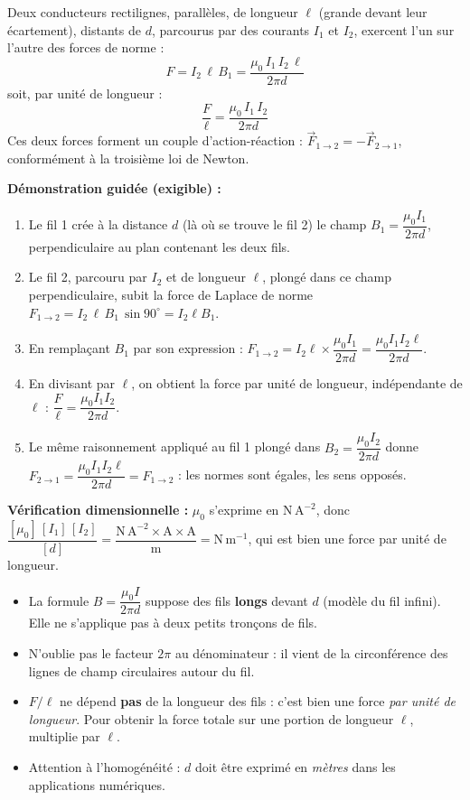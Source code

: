 \documentclass[11pt]{article}
\newcommand{\cle}[1]{{\popxbold\color{popdark}#1}}
\begin{document}
\begin{propriete}
Deux conducteurs rectilignes, parallèles, de longueur $\ell$ (grande devant leur écartement), distants de $d$, parcourus par des courants $I_1$ et $I_2$, exercent l'un sur l'autre des forces de norme :
\[ F = I_2\, \ell\, B_1 = \frac{\mu_0\, I_1\, I_2\, \ell}{2\pi d} \]
soit, par unité de longueur :
\[ \boxed{\ \frac{F}{\ell} = \frac{\mu_0\, I_1\, I_2}{2\pi d}\ } \]
Ces deux forces forment un couple d'\cle{action-réaction} : $\vec{F}_{1\to 2} = -\vec{F}_{2\to 1}$, conformément à la troisième loi de Newton.

\textbf{Démonstration guidée (exigible) :}
\begin{enumerate}
\item Le fil 1 crée à la distance $d$ (là où se trouve le fil 2) le champ $B_1 = \dfrac{\mu_0 I_1}{2\pi d}$, perpendiculaire au plan contenant les deux fils.
\item Le fil 2, parcouru par $I_2$ et de longueur $\ell$, plongé dans ce champ perpendiculaire, subit la force de Laplace de norme $F_{1\to 2} = I_2\, \ell\, B_1\, \sin 90^\circ = I_2 \ell B_1$.
\item En remplaçant $B_1$ par son expression : $F_{1\to 2} = I_2 \ell \times \dfrac{\mu_0 I_1}{2\pi d} = \dfrac{\mu_0 I_1 I_2 \ell}{2\pi d}$.
\item En divisant par $\ell$, on obtient la force par unité de longueur, indépendante de $\ell$ : $\dfrac{F}{\ell} = \dfrac{\mu_0 I_1 I_2}{2\pi d}$.
\item Le même raisonnement appliqué au fil 1 plongé dans $B_2 = \dfrac{\mu_0 I_2}{2\pi d}$ donne $F_{2\to 1} = \dfrac{\mu_0 I_1 I_2 \ell}{2\pi d} = F_{1\to 2}$ : les normes sont égales, les sens opposés.
\end{enumerate}

\textbf{Vérification dimensionnelle :} $\mu_0$ s'exprime en $\mathrm{N\,A^{-2}}$, donc $\dfrac{[\mu_0]\,[I_1]\,[I_2]}{[d]} = \dfrac{\mathrm{N\,A^{-2}} \times \mathrm{A} \times \mathrm{A}}{\mathrm{m}} = \mathrm{N\,m^{-1}}$, qui est bien une force par unité de longueur.
\end{propriete}

\begin{attention}
\begin{itemize}
\item La formule $B = \dfrac{\mu_0 I}{2\pi d}$ suppose des fils \textbf{longs} devant $d$ (modèle du fil infini). Elle ne s'applique pas à deux petits tronçons de fils.
\item N'oublie pas le facteur $2\pi$ au dénominateur : il vient de la circonférence des lignes de champ circulaires autour du fil.
\item $F/\ell$ ne dépend \textbf{pas} de la longueur des fils : c'est bien une force \emph{par unité de longueur}. Pour obtenir la force totale sur une portion de longueur $\ell$, multiplie par $\ell$.
\item Attention à l'homogénéité : $d$ doit être exprimé en \emph{mètres} dans les applications numériques.
\end{itemize}
\end{attention}
\end{document}
